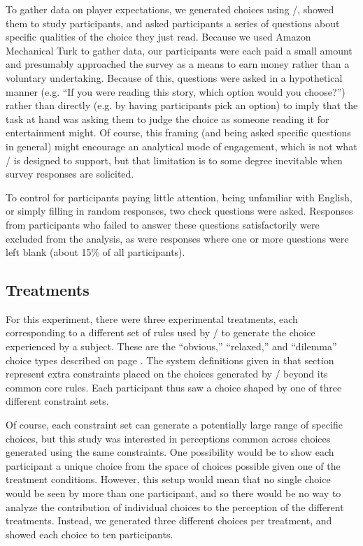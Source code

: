 To gather data on player expectations, we generated choices using \dunyazad/, showed them to study participants, and asked participants a series of questions about specific qualities of the choice they just read.
%
Because we used Amazon Mechanical Turk to gather data, our participants were each paid a small amount and presumably approached the survey as a means to earn money rather than a voluntary undertaking.
%
Because of this, questions were asked in a hypothetical manner (e.g. ``If you were reading this story, which option would you choose?'') rather than directly (e.g. by having participants pick an option) to imply that the task at hand was asking them to judge the choice as someone reading it for entertainment might.
%
Of course, this framing (and being asked specific questions in general) might encourage an analytical mode of engagement, which is not what \dunyazad/ is designed to support, but that limitation is to some degree inevitable when survey responses are solicited.


To control for participants paying little attention, being unfamiliar with English, or simply filling in random responses, two check questions were asked.
%
Responses from participants who failed to answer these questions satisfactorily were excluded from the analysis, as were responses where one or more questions were left blank (about 15\% of all participants).

\subsection{Treatments}

For this experiment, there were three experimental treatments, each corresponding to a different set of rules used by \dunyazad/ to generate the choice experienced by a subject.
%
These are the ``obvious,'' ``relaxed,'' and ``dilemma'' choice types described on page \pageref{page:choicetypes}.
%
The system definitions given in that section represent extra constraints placed on the choices generated by \dunyazad/ beyond its common core rules.
%
Each participant thus saw a choice shaped by one of three different constraint sets.


Of course, each constraint set can generate a potentially large range of specific choices, but this study was interested in perceptions common across choices generated using the same constraints.
%
One possibility would be to show each participant a unique choice from the space of choices possible given one of the treatment conditions.
%
However, this setup would mean that no single choice would be seen by more than one participant, and so there would be no way to analyze the contribution of individual choices to the perception of the different treatments.
%
Instead, we generated three different choices per treatment, and showed each choice to ten participants.

